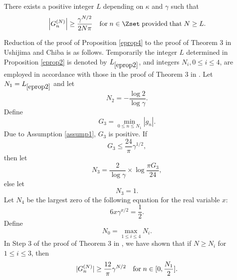 \begin{prop}
\label{eprop4}
There exists a positive integer $L$ depending on $\kappa$ and $\gamma$ such that
\begin{displaymath}
\left|G^{(N)}_n\right| \ge \frac{\gamma^{N/2}}{2N\pi} \quad {\rm for}\; n \in \Zset \;{\rm provided}\;{\rm that}\; N \ge L.
\end{displaymath}
\end{prop}
\begin{pf}
%
Reduction of the proof of Proposition \ref{eprop4} to the proof of Theorem 3 in Ushijima and Chiba \cite{ushijima-chiba1} is as follows. Temporarily the integer $L$ determined in Proposition \ref{eprop2} is denoted by $L_{\ref{eprop2}}$, and integers $N_i,0 \le i \le 4$, are employed in accordance with those in the proof of Theorem 3 in \cite{ushijima-chiba1}. Let ${{N}}_1=L_{\ref{eprop2}}$ and let 
\begin{displaymath}
{{N}}_2=-\frac{\log 2}{\log\gamma}.
\end{displaymath}
Define
\begin{displaymath}
G_3=\min_{0\le n \le {{N}}_1}|g_n|.
\end{displaymath}
Due to Assumption \ref{assump1}, $G_3$ is positive. If
\begin{displaymath}
G_3 \le \frac{24}{\pi}\gamma^{1/2},
\end{displaymath}
then let
\begin{displaymath}
{{N}}_3=\frac{2}{\log\gamma} \times \log\frac{\pi G_3}{24},
\end{displaymath}
else let
\begin{displaymath}
{{N}}_3=1.
\end{displaymath}
Let ${{N}}_4$ be the largest zero of the following equation for the real variable $x$:
\begin{displaymath}
6x\gamma^{x/2}=\frac{1}{2}.
\end{displaymath}
Define
\begin{displaymath}
{{N}}_0=\max_{1\le i \le 4}{{N}}_i.
\end{displaymath}
In Step 3 of the proof of Theorem 3 in \cite{ushijima-chiba1}, we have shown that if $N \ge {{N}}_i$ for $1 \le i \le 3$, then
\begin{displaymath}
|G^{(N)}_n| \ge \frac{12}{\pi}\gamma^{N/2} \quad {\rm for}\;n\in[0,\frac{{{N}}_1}{2}].
\end{displaymath}

\end{pf}
